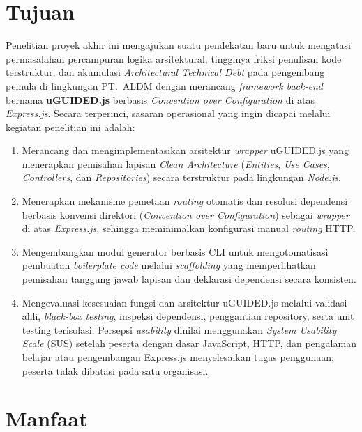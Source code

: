 \documentclass[12pt,a4paper,oneside]{report}
\begin{document}
\section{Tujuan}
\label{sec:tujuan}

Penelitian proyek akhir ini mengajukan suatu pendekatan baru untuk mengatasi permasalahan percampuran logika arsitektural, tingginya friksi penulisan kode terstruktur, dan akumulasi \textit{Architectural Technical Debt} pada pengembang pemula di lingkungan PT.\ ALDM dengan merancang \textit{framework back-end} bernama \textbf{uGUIDED.js} berbasis \textit{Convention over Configuration} di atas \textit{Express.js}. Secara terperinci, sasaran operasional yang ingin dicapai melalui kegiatan penelitian ini adalah:
\begin{enumerate}
    \item Merancang dan mengimplementasikan arsitektur \textit{wrapper} uGUIDED.js yang menerapkan pemisahan lapisan \textit{Clean Architecture} (\textit{Entities}, \textit{Use Cases}, \textit{Controllers}, dan \textit{Repositories}) secara terstruktur pada lingkungan \textit{Node.js}.
    \item Menerapkan mekanisme pemetaan \textit{routing} otomatis dan resolusi dependensi berbasis konvensi direktori (\textit{Convention over Configuration}) sebagai \textit{wrapper} di atas \textit{Express.js}, sehingga meminimalkan konfigurasi manual \textit{routing} HTTP.
    \item Mengembangkan modul generator berbasis CLI untuk mengotomatisasi pembuatan \textit{boilerplate code} melalui \textit{scaffolding} yang memperlihatkan pemisahan tanggung jawab lapisan dan deklarasi dependensi secara konsisten.
    \item Mengevaluasi kesesuaian fungsi dan arsitektur uGUIDED.js melalui validasi ahli, \textit{black-box testing}, inspeksi dependensi, penggantian repository, serta unit testing terisolasi. Persepsi \textit{usability} dinilai menggunakan \textit{System Usability Scale} (SUS) setelah peserta dengan dasar JavaScript, HTTP, dan pengalaman belajar atau pengembangan Express.js menyelesaikan tugas penggunaan; peserta tidak dibatasi pada satu organisasi.
\end{enumerate}

\section{Manfaat}
\label{sec:manfaat}
\end{document}
